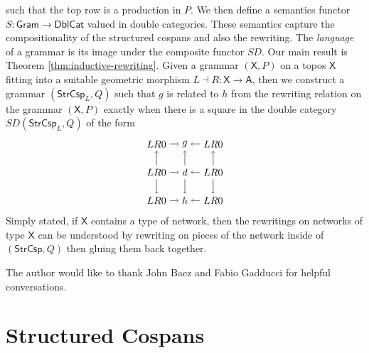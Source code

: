 \documentclass{amsart}
\newcommand{\A}{\cat{A}}
\newcommand{\X}{\cat{X}}
\newcommand{\DblCat}{\cat{DblCat}}
\newcommand{\Gram}{\cat{Gram}}
\newcommand{\StrCsp}{\cat{StrCsp}}
\newcommand{\cat}[1]{\mathsf{#1}}
\newcommand{\from}{\colon}
\theoremstyle{remark}
\theoremstyle{definition}
\begin{document}
% 
such that the top row is a production in $ P $. We then define a
semantics functor $ S \from \Gram \to \DblCat $ valued in double
categories.  These semantics capture the compositionality of the
structured cospans and also the rewriting.  The \emph{language} of a
grammar is its image under the composite functor $ SD $. Our main
result is Theorem \ref{thm:inductive-rewriting}. Given a grammar
$ ( \X , P ) $ on a topos $ \X $ fitting into a suitable geometric
morphism $ L \dashv R \from \X \to \A $, then we construct a grammar $
( \StrCsp_L , Q ) $ such that $ g $ is related to $ h $ from the
rewriting relation on the grammar $ ( \X , P ) $ exactly when there is
a square in the double category $ SD ( \StrCsp_L , Q ) $ of the form
\[
    \begin{tikzpicture}
      \node (1t) at (0,2) {$ LR 0 $};
      \node (2t) at (1,2) {$ g $};
      \node (3t) at (2,2) {$ LR 0 $};
      \node (1m) at (0,1) {$ LR 0 $};
      \node (2m) at (1,1) {$ d $};
      \node (3m) at (2,1) {$ LR 0 $};
      \node (1b) at (0,0) {$ LR 0 $};
      \node (2b) at (1,0) {$ h $};
      \node (3b) at (2,0) {$ LR 0 $};
      \draw [->] (1t) to node [] {\scriptsize{$  $}} (2t);
      \draw [->] (3t) to node [] {\scriptsize{$  $}} (2t);
      \draw [->] (1m) to node [] {\scriptsize{$  $}} (2m);
      \draw [->] (3m) to node [] {\scriptsize{$  $}} (2m);
      \draw [->] (1b) to node [] {\scriptsize{$  $}} (2b);
      \draw [->] (3b) to node [] {\scriptsize{$  $}} (2b);
      \draw [->] (1m) to node [] {\scriptsize{$  $}} (1t);
      \draw [->] (1m) to node [] {\scriptsize{$  $}} (1b);
      \draw [->] (2m) to node [] {\scriptsize{$  $}} (2t);
      \draw [->] (2m) to node [] {\scriptsize{$  $}} (2b);
      \draw [->] (3m) to node [] {\scriptsize{$  $}} (3t);
      \draw [->] (3m) to node [] {\scriptsize{$  $}} (3b);
    \end{tikzpicture}
\]
Simply stated, if $ \X $ contains a type of network, then the
rewritings on networks of type $ \X $ can be understood by rewriting
on pieces of the network inside of $ ( \StrCsp , Q ) $ then gluing
them back together.

The author would like to thank John Baez and Fabio Gadducci for
helpful conversations.


\section{Structured Cospans}
\label{sec:StrCsp}
\end{document}
